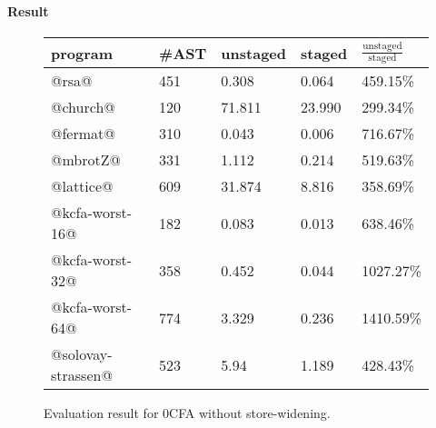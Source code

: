 \iffalse
We used the following benchmark programs:
\begin{itemize}
  \item \textbf{rsa}: The RSA public key encryption algorithm.
  \item \textbf{kcfa3}: A difficult benchmark for $k$-CFA.
  \item \textbf{church}: Church numerals with additions and mutiplications.
  \item \textbf{fermat}: Fermat and Solovay-Strassen primality testing.
  \item \textbf{kcfa-worst-case-}\textit{n}: 
    Benchmark programs that are supposed to be tough cases for $k$-CFA; 
    the number $n$ indicates the depth of nesting lambda terms.
\end{itemize}
\fi

\paragraph{Result}

\begin{figure}[h]
\tiny
\begin{tabular}{@{}lllll@{}}
\toprule
    program             &\#AST & unstaged   & staged     & $\frac{\text{unstaged}}{\text{staged}}$ \\ \midrule
    @rsa@               & 451  & 0.308      & 0.064      & 459.15\%          \\
    @church@            & 120  & 71.811     & 23.990     & 299.34\%          \\
    @fermat@            & 310  & 0.043      & 0.006      & 716.67\%          \\
    @mbrotZ@            & 331  & 1.112      & 0.214      & 519.63\%          \\
    @lattice@           & 609  & 31.874     & 8.816      & 358.69\%          \\
    @kcfa-worst-16@     & 182  & 0.083      & 0.013      & 638.46\%          \\
    @kcfa-worst-32@     & 358  & 0.452      & 0.044      & 1027.27\%         \\
    @kcfa-worst-64@     & 774  & 3.329      & 0.236      & 1410.59\%         \\
    @solovay-strassen@  & 523  & 5.94       & 1.189      & 428.43\%          \\
    \bottomrule
\end{tabular}
\caption{Evaluation result for 0CFA without store-widening.} \label{evaluation_result}
\end{figure}

